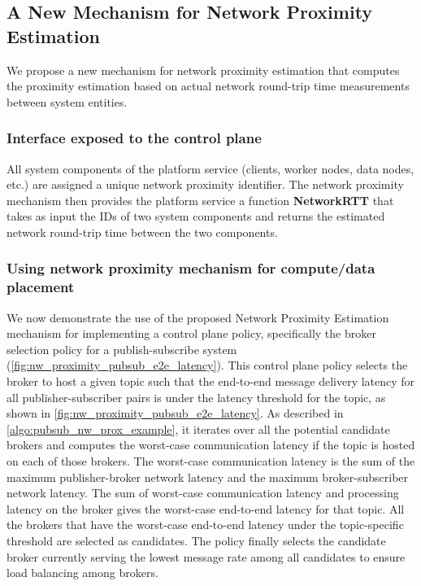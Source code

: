 \subsection{A New Mechanism for Network Proximity Estimation}
We propose a new mechanism for network proximity estimation that computes the proximity estimation based on actual network round-trip time measurements between system entities.
\subsubsection{Interface exposed to the control plane}
All system components of the platform service (clients, worker nodes, data nodes, etc.) are assigned a unique network proximity identifier. The network proximity mechanism then provides the platform service a function \textbf{NetworkRTT} that takes as input the IDs of two system components and returns the estimated network round-trip time between the two components. 

\subsubsection{Using network proximity mechanism for compute/data placement}
\label{sec:policy_using_nw_prox}

We now demonstrate the use of the proposed Network Proximity Estimation mechanism for implementing a control plane policy, specifically the broker selection policy for a publish-subscribe system (\cref{fig:nw_proximity_pubsub_e2e_latency}). This control plane policy selects the broker to host a given topic such that the end-to-end message delivery latency for all publisher-subscriber pairs is under the latency threshold for the topic, as shown in \cref{fig:nw_proximity_pubsub_e2e_latency}. As described in \cref{algo:pubsub_nw_prox_example}, it iterates over all the potential candidate brokers and computes the worst-case communication latency if the topic is hosted on each of those brokers. The worst-case communication latency is the sum of the maximum publisher-broker network latency and the maximum broker-subscriber network latency. The sum of worst-case communication latency and processing latency on the broker gives the worst-case end-to-end latency for that topic. All the brokers that have the worst-case end-to-end latency under the topic-specific threshold are selected as candidates. The policy finally selects the candidate broker currently serving the lowest message rate among all candidates to ensure load balancing among brokers.

